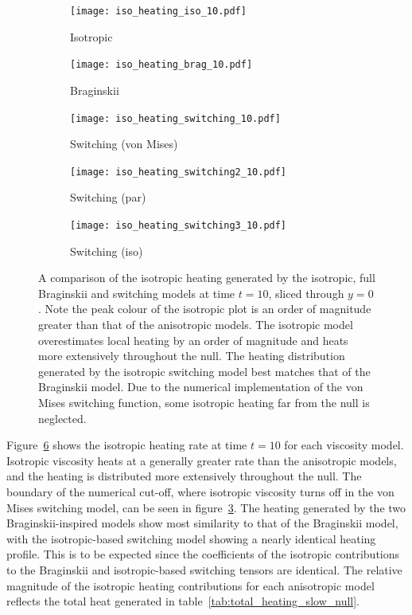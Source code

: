 \begin{figure}[t]
    \centering
    \hfill
    \begin{subfigure}{0.32\textwidth}
      \texttt{[image: iso\_heating\_iso\_10.pdf]}
      \caption{Isotropic}%
      \label{fig:iso_heating_iso_10}
    \end{subfigure}
    \hfill
    \begin{subfigure}{0.32\textwidth}
      \texttt{[image: iso\_heating\_brag\_10.pdf]}
      \caption{Braginskii}%
      \label{fig:iso_heating_brag_10}
    \end{subfigure}
    \hfill
    \begin{subfigure}{0.32\textwidth}
      \texttt{[image: iso\_heating\_switching\_10.pdf]}
      \caption{Switching (von Mises)}%
      \label{fig:iso_heating_switching_10}
    \end{subfigure}
    \begin{subfigure}{0.32\textwidth}
      \texttt{[image: iso\_heating\_switching2\_10.pdf]}
      \caption{Switching (par)}%
      \label{fig:iso_heating_switching2_10}
    \end{subfigure}
    \begin{subfigure}{0.32\textwidth}
      \texttt{[image: iso\_heating\_switching3\_10.pdf]}
      \caption{Switching (iso)}%
      \label{fig:iso_heating_switching3_10}
    \end{subfigure}

    \caption{A comparison of the isotropic heating generated by the isotropic, full Braginskii and switching models at time $t=10$, sliced through $y=0$. Note the peak colour of the isotropic plot is an order of magnitude greater than that of the anisotropic models. The isotropic model overestimates local heating by an order of magnitude and heats more extensively throughout the null. The heating distribution generated by the isotropic switching model best matches that of the Braginskii model. Due to the numerical implementation of the von Mises switching function, some isotropic heating far from the null is neglected.}
\label{fig:isotropic_heating}%
\end{figure}

Figure~\ref{fig:isotropic_heating} shows the isotropic heating rate at time $t=10$ for each viscosity model. Isotropic viscosity heats at a generally greater rate than the anisotropic models, and the heating is distributed more extensively throughout the null. The boundary of the numerical cut-off, where isotropic viscosity turns off in the von Mises switching model, can be seen in figure~\ref{fig:iso_heating_switching_10}. The heating generated by the two Braginskii-inspired models show most similarity to that of the Braginskii model, with the isotropic-based switching model showing a nearly identical heating profile. This is to be expected since the coefficients of the isotropic contributions to the Braginskii and isotropic-based switching tensors are identical. The relative magnitude of the isotropic heating contributions for each anisotropic model reflects the total heat generated in table~\ref{tab:total_heating_slow_null}.

